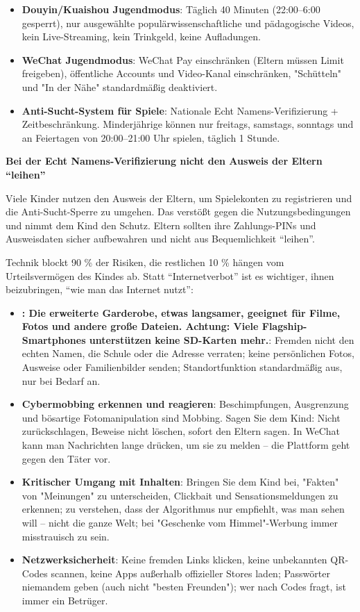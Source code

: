 \begin{itemize}
  \item \textbf{Douyin/Kuaishou Jugendmodus}: Täglich 40 Minuten (22:00–6:00 gesperrt), nur ausgewählte populärwissenschaftliche und pädagogische Videos, kein Live-Streaming, kein Trinkgeld, keine Aufladungen.
  \item \textbf{WeChat Jugendmodus}: WeChat Pay einschränken (Eltern müssen Limit freigeben), öffentliche Accounts und Video-Kanal einschränken, "Schütteln" und "In der Nähe" standardmäßig deaktiviert.
  \item \textbf{Anti-Sucht-System für Spiele}: Nationale Echt Namens-Verifizierung + Zeitbeschränkung. Minderjährige können nur freitags, samstags, sonntags und an Feiertagen von 20:00–21:00 Uhr spielen, täglich 1 Stunde.
\end{itemize}

\textbf{Bei der Echt Namens-Verifizierung nicht den Ausweis der Eltern “leihen”}\par

Viele Kinder nutzen den Ausweis der Eltern, um Spielekonten zu registrieren und die Anti-Sucht-Sperre zu umgehen. Das verstößt gegen die Nutzungsbedingungen und nimmt dem Kind den Schutz. Eltern sollten ihre Zahlungs-PINs und Ausweisdaten sicher aufbewahren und nicht aus Bequemlichkeit “leihen”.


Technik blockt 90 \% der Risiken, die restlichen 10 \% hängen vom Urteilsvermögen des Kindes ab. Statt “Internetverbot” ist es wichtiger, ihnen beizubringen, “wie man das Internet nutzt”:

\begin{itemize}
  \item \textbf{: Die erweiterte Garderobe, etwas langsamer, geeignet für Filme, Fotos und andere große Dateien. Achtung: Viele Flagship-Smartphones unterstützen keine SD-Karten mehr.}: Fremden nicht den echten Namen, die Schule oder die Adresse verraten; keine persönlichen Fotos, Ausweise oder Familienbilder senden; Standortfunktion standardmäßig aus, nur bei Bedarf an.
  \item \textbf{Cybermobbing erkennen und reagieren}: Beschimpfungen, Ausgrenzung und bösartige Fotomanipulation sind Mobbing. Sagen Sie dem Kind: Nicht zurückschlagen, Beweise nicht löschen, sofort den Eltern sagen. In WeChat kann man Nachrichten lange drücken, um sie zu melden – die Plattform geht gegen den Täter vor.
  \item \textbf{Kritischer Umgang mit Inhalten}: Bringen Sie dem Kind bei, "Fakten" von "Meinungen" zu unterscheiden, Clickbait und Sensationsmeldungen zu erkennen; zu verstehen, dass der Algorithmus nur empfiehlt, was man sehen will – nicht die ganze Welt; bei "Geschenke vom Himmel"-Werbung immer misstrauisch zu sein.
  \item \textbf{Netzwerksicherheit}: Keine fremden Links klicken, keine unbekannten QR-Codes scannen, keine Apps außerhalb offizieller Stores laden; Passwörter niemandem geben (auch nicht "besten Freunden"); wer nach Codes fragt, ist immer ein Betrüger.
\end{itemize}

